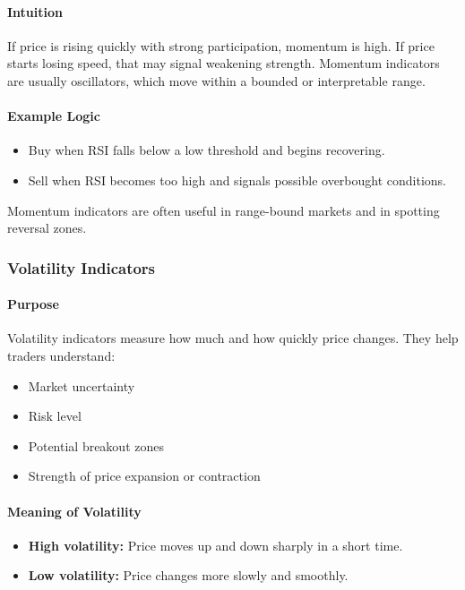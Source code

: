 \documentclass[12pt,openany]{book}
\begin{document}
\paragraph{Intuition}
If price is rising quickly with strong participation, momentum is high. If price starts losing speed, that may signal weakening strength. Momentum indicators are usually oscillators, which move within a bounded or interpretable range.

\paragraph{Example Logic}
\begin{itemize}[leftmargin=*]
    \item Buy when RSI falls below a low threshold and begins recovering.
    \item Sell when RSI becomes too high and signals possible overbought conditions.
\end{itemize}

Momentum indicators are often useful in range-bound markets and in spotting reversal zones.

\subsubsection{Volatility Indicators}

\paragraph{Purpose}
Volatility indicators measure how much and how quickly price changes. They help traders understand:

\begin{itemize}[leftmargin=*]
    \item Market uncertainty
    \item Risk level
    \item Potential breakout zones
    \item Strength of price expansion or contraction
\end{itemize}

\paragraph{Meaning of Volatility}
\begin{itemize}[leftmargin=*]
    \item \textbf{High volatility:} Price moves up and down sharply in a short time.
    \item \textbf{Low volatility:} Price changes more slowly and smoothly.
\end{itemize}
\end{document}
